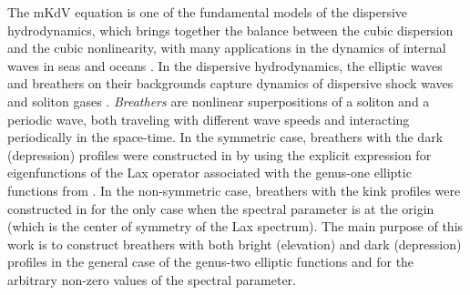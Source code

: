 \documentclass[12pt,reqno]{amsart}
\numberwithin{equation}{section}
\begin{document}
The mKdV equation is one of the fundamental models of the dispersive hydrodynamics, which brings together the balance between the cubic dispersion 
and the cubic nonlinearity, with many applications in the dynamics of internal waves in seas and oceans \cite{Grimshaw,Pelinovsky}. In the dispersive 
hydrodynamics, the elliptic waves and breathers on their backgrounds capture dynamics of dispersive shock waves and soliton gases \cite{ACEHL}. {\em Breathers} are nonlinear superpositions of a soliton and a periodic wave, both traveling with different wave speeds and interacting periodically in the space-time. In the symmetric case, breathers with the dark (depression) profiles were constructed in \cite{MP24} by using the explicit expression for eigenfunctions of the Lax operator associated with the genus-one elliptic functions from \cite{Takahashi}. In the non-symmetric case, breathers with the kink profiles were constructed in \cite{AP25} for the only case when the spectral parameter is at the origin (which is the center of symmetry of the Lax spectrum). The main purpose of this work is to construct breathers with both bright (elevation) and dark (depression) profiles in the general case of the genus-two elliptic functions and for the arbitrary non-zero values of the spectral parameter. 
\end{document}

